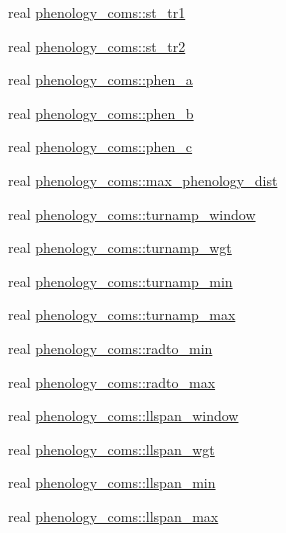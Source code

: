 \begin{DoxyCompactItemize}
\item 
real \hyperlink{namespacephenology__coms_a5c001b38efaaf1a409368ebdef81ff3f}{phenology\+\_\+coms\+::st\+\_\+tr1}
\item 
real \hyperlink{namespacephenology__coms_a0f83a1b2d886e1d4979eece0617b48bd}{phenology\+\_\+coms\+::st\+\_\+tr2}
\item 
real \hyperlink{namespacephenology__coms_a68b65a488b28872a9aca9fed46ba4eaf}{phenology\+\_\+coms\+::phen\+\_\+a}
\item 
real \hyperlink{namespacephenology__coms_add9263a2bb7374fee2ecef8d4ec4f53c}{phenology\+\_\+coms\+::phen\+\_\+b}
\item 
real \hyperlink{namespacephenology__coms_a8aee741f7b4cfd7e550ca881a5b4e7fc}{phenology\+\_\+coms\+::phen\+\_\+c}
\item 
real \hyperlink{namespacephenology__coms_a4a4912109f533ba9809ceef7779a7f8f}{phenology\+\_\+coms\+::max\+\_\+phenology\+\_\+dist}
\item 
real \hyperlink{namespacephenology__coms_aecd43b018bd6d97e1f0cd1035425ef70}{phenology\+\_\+coms\+::turnamp\+\_\+window}
\item 
real \hyperlink{namespacephenology__coms_a74da3350aa535ec8435c893d39cf6d3e}{phenology\+\_\+coms\+::turnamp\+\_\+wgt}
\item 
real \hyperlink{namespacephenology__coms_a297e142977c3850943f8004c4b2e628a}{phenology\+\_\+coms\+::turnamp\+\_\+min}
\item 
real \hyperlink{namespacephenology__coms_acc24a16f84bb52f7afcd9bd34d0ea4b1}{phenology\+\_\+coms\+::turnamp\+\_\+max}
\item 
real \hyperlink{namespacephenology__coms_a25085ef20a0cb8bb667f6e76ddf4445d}{phenology\+\_\+coms\+::radto\+\_\+min}
\item 
real \hyperlink{namespacephenology__coms_a7c53ccd64544ccd13e9bd239afd17efb}{phenology\+\_\+coms\+::radto\+\_\+max}
\item 
real \hyperlink{namespacephenology__coms_a0f473ccc54ccda95e91258f1fa8ca7f5}{phenology\+\_\+coms\+::llspan\+\_\+window}
\item 
real \hyperlink{namespacephenology__coms_a2c1ffd80335f4c1fc91d2c191ef3ac54}{phenology\+\_\+coms\+::llspan\+\_\+wgt}
\item 
real \hyperlink{namespacephenology__coms_a716e4a155d793c6a9c915a89152bc4d5}{phenology\+\_\+coms\+::llspan\+\_\+min}
\item 
real \hyperlink{namespacephenology__coms_a382ead59b03576ca7a302bbf12b8209c}{phenology\+\_\+coms\+::llspan\+\_\+max}

\end{DoxyCompactItemize}
